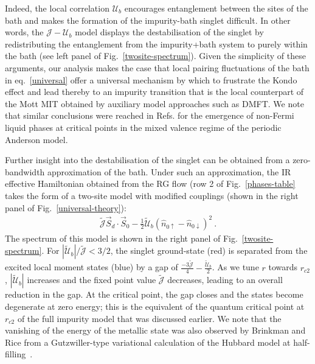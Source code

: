 \documentclass{iopart}
\begin{document}
Indeed, the local correlation $\mathcal{U}_b$ encourages entanglement between the sites of the bath and makes the formation of the impurity-bath singlet difficult. In other words, the \(\mathcal{J}-\mathcal{U}_b\) model displays the destabilisation of the singlet by redistributing the entanglement from the impurity+bath system to purely within the bath (see left panel of Fig.~\eqref{twosite-spectrum}). Given the simplicity of these arguments, 
our analysis makes the case that local pairing fluctuations of the bath in eq.~\eqref{universal} offer a universal mechanism by which to frustrate the Kondo effect and lead thereby to an impurity transition that is the local counterpart of the Mott MIT obtained by auxiliary model approaches such as DMFT. We note that similar conclusions were reached in Refs.\cite{si_kotliar_1993,kotliarsi_1993,kotliar_1996} for the emergence of non-Fermi liquid phases at critical points in the mixed valence regime of the periodic Anderson model.

Further insight into the destabilisation of the singlet can be obtained from a zero-bandwidth approximation of the bath. Under such an approximation, the IR effective Hamiltonian obtained 
from the RG flow (row 2 of Fig.~\eqref{phases-table} takes the form of a two-site model with modified couplings (shown in the right panel of Fig.~\eqref{universal-theory}):
\begin{eqnarray}
\mathcal{\tilde J} \vec{S}_d\cdot\vec{S}_0 - \frac{1}{2}\mathcal{\tilde U}_b\left(\hat n_{0 \uparrow} - \hat n_{0 \downarrow}\right)^2 \label{zero-bw-pic}~.
\end{eqnarray}
The spectrum of this model is shown in the right panel of Fig.~\eqref{twosite-spectrum}. For \(|\mathcal{\tilde U}_b|/\mathcal{\tilde J} < 3/2\), the singlet ground-state (red) is separated from the excited local moment states (blue) by a gap of \(\frac{-3\mathcal{\tilde J}}{4} - \frac{\mathcal{\tilde U}_b}{2}\). As we tune \(r\) towards \(r_{c2}\), \(|\mathcal{\tilde U}_b|\) increases and the fixed point value \(\mathcal{\tilde J}\) decreases, leading to an overall reduction in the gap. At the critical point, the gap closes and the states become degenerate at zero energy; this is the equivalent of the quantum critical point at $r_{c2}$ of the full impurity model that was discussed earlier. We note that the vanishing of the energy of the metallic state was also observed by Brinkman and Rice from a Gutzwiller-type variational calculation of the Hubbard model at half-filling~\cite{brinkman_rice_1970}.
\end{document}

